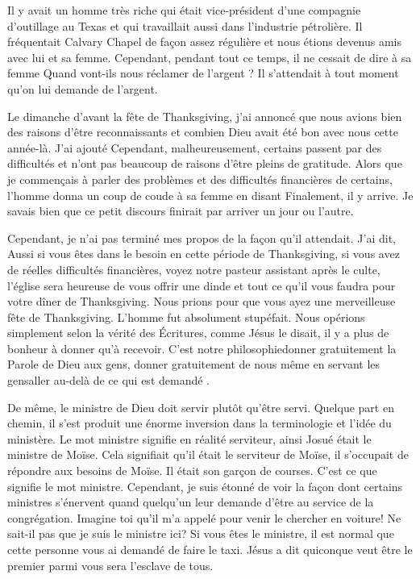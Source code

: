 Il y avait un homme très riche qui était vice-président d’une compagnie d’outillage au Texas et qui travaillait aussi
dans l’industrie pétrolière. Il fréquentait Calvary Chapel de façon assez régulière et nous étions devenus amis avec lui
et sa femme. Cependant, pendant tout ce temps, il ne cessait de dire à sa femme \og Quand vont-ils nous réclamer de
l’argent ?\fg{} Il s’attendait à tout moment qu’on lui demande de l'argent.

Le dimanche d’avant la fête de Thanksgiving, j’ai annoncé que nous avions bien des raisons d’être reconnaissants et
combien Dieu avait été bon avec nous cette année-là. J’ai ajouté \og Cependant, malheureusement, certains passent par
des difficultés et n’ont pas beaucoup de raisons d’être pleins de gratitude.\fg{} Alors que je commençais à parler des
problèmes et des difficultés financières de certains, l’homme donna un coup de coude à sa femme en disant\frcolon
\og Finalement, il y arrive. Je savais bien que ce petit discours finirait par arriver un jour ou l’autre.\fg{}

Cependant, je n'ai pas terminé mes propos de la façon qu’il attendait. J'ai dit, \og Aussi si vous êtes dans le besoin en
cette période de Thanksgiving, si vous avez de réelles difficultés financières, voyez notre pasteur assistant après le
culte, l’église sera heureuse de vous offrir une dinde et tout ce qu’il vous faudra pour votre dîner de Thanksgiving.
Nous prions pour que vous ayez une merveilleuse fête de Thanksgiving.\fg{} L’homme fut absolument stupéfait. Nous
opérions simplement selon la vérité des Écritures, comme Jésus le disait, il y a plus de bonheur à donner qu’à
recevoir. C’est notre philosophie\frcolon donner gratuitement la Parole de Dieu aux gens, donner gratuitement de nous
même en servant les gens\frcolon aller au-delà de ce qui est demandé .

De même, le ministre de Dieu doit servir plutôt qu’être servi. Quelque part en chemin, il s’est produit une énorme
inversion dans la terminologie et l’idée du ministère. Le mot \og ministre\fg{} signifie en réalité \og serviteur\fg{}, ainsi Josué était
le ministre de Moïse. Cela signifiait qu’il était le serviteur de Moïse, il s’occupait de répondre aux besoins de Moïse. Il
était son garçon de courses. C’est ce que signifie le mot \og ministre\fg{}. Cependant, je suis étonné de voir la façon dont
certains ministres s’énervent quand quelqu’un leur demande d'être au service de la congrégation. \og Imagine toi qu’il
m’a appelé pour venir le chercher en voiture! Ne sait-il pas que je suis le ministre ici?\fg{} Si vous êtes le ministre, il est
normal que cette personne vous ai demandé de faire le taxi. Jésus a dit \og quiconque veut être le premier parmi vous
sera l’esclave de tous.\fg{}

